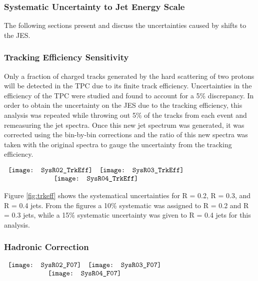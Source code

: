\subsubsection{Systematic Uncertainty to Jet Energy Scale}

The following sections present and discuss the uncertainties caused by shifts to the JES. 

\subsubsection{Tracking Efficiency Sensitivity}
Only a fraction of charged tracks generated by the hard scattering of two protons will be detected in the TPC due to its finite track efficiency.  Uncertainties in the efficiency of the TPC were studied and found to account for a 5\% discrepancy\cite{Abelev:2013ala}.  In order to obtain the uncertainty on the JES due to the tracking efficiency, this analysis was repeated while throwing out 5\% of the tracks from each event and remeasuring the jet spectra.  Once this new jet spectrum was generated, it was corrected using the bin-by-bin corrections and the ratio of this new spectra was taken with the original spectra to gauge the uncertainty from the tracking efficiency.


\begin{figure*}[t!]
$\begin{array}{rl}
    \texttt{[image: SysR02\_TrkEff]} &
    \texttt{[image: SysR03\_TrkEff]}\\
    \multicolumn{2}{c}{\texttt{[image: SysR04\_TrkEff]}}
\end{array}$
\caption[Systematic due to TPC tracking efficiency.]{\label{fig:trkeff}Systematic due to TPC tracking efficiency; R = 0.2 \textit{(top left)}, R = 0.3 \textit{(top right)}, R = 0.4 \textit{(bottom)}.}
\end{figure*}


Figure \ref{fig:trkeff} shows the systematical uncertainties for R = 0.2, R = 0.3, and R = 0.4 jets.  From the figures a 10\% systematic was assigned to R = 0.2 and R = 0.3 jets, while a 15\% systematic uncertainty was given to R = 0.4 jets for this analysis.

\subsubsection{Hadronic Correction}

\begin{figure*}[t!]
$\begin{array}{rl}
    \texttt{[image: SysR02\_F07]} &
    \texttt{[image: SysR03\_F07]}\\
    \multicolumn{2}{c}{\texttt{[image: SysR04\_F07]}}
\end{array}$
\caption[Systematic due to Hadronic correction.]{\label{fig:hadeff}Systematic due to hadronic correction efficiency; R = 0.2 \textit{(top left)}, R = 0.3 \textit{(top right)}, R = 0.4 \textit{(bottom)}.}
\end{figure*}

